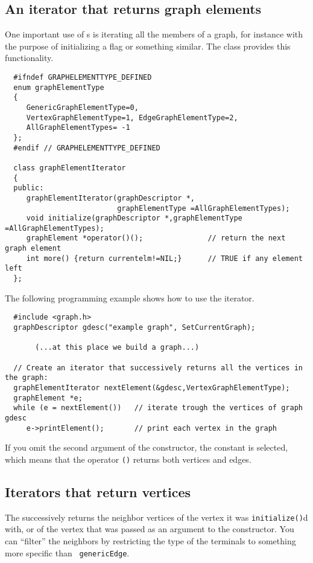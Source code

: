 \subsection{An iterator that returns graph elements}
One important use of s is iterating all the members of a
graph, for instance with the purpose of initializing a flag or something
similar. The  class provides this functionality.

{\footnotesize \begin{verbatim}
  #ifndef GRAPHELEMENTTYPE_DEFINED
  enum graphElementType
  {
     GenericGraphElementType=0,
     VertexGraphElementType=1, EdgeGraphElementType=2,
     AllGraphElementTypes= -1
  };
  #endif // GRAPHELEMENTTYPE_DEFINED

  class graphElementIterator
  {
  public:
     graphElementIterator(graphDescriptor *,
                          graphElementType =AllGraphElementTypes);
     void initialize(graphDescriptor *,graphElementType =AllGraphElementTypes);
     graphElement *operator()();               // return the next graph element
     int more() {return currentelm!=NIL;}      // TRUE if any element left
  };
\end{verbatim}}

The following programming example shows how to use the iterator.

{\footnotesize \begin{verbatim}
  #include <graph.h>
  graphDescriptor gdesc("example graph", SetCurrentGraph);
  
       (...at this place we build a graph...)
  
  // Create an iterator that successively returns all the vertices in the graph:
  graphElementIterator nextElement(&gdesc,VertexGraphElementType);
  graphElement *e;
  while (e = nextElement())   // iterate trough the vertices of graph gdesc
     e->printElement();       // print each vertex in the graph
\end{verbatim}}

If you omit the second argument of the constructor, the constant
 is selected, which means that the operator {\tt ()}
returns both vertices and edges.

\subsection{Iterators that return vertices}
The  successively returns the neighbor
vertices of the vertex it was {\tt initialize()}d with, or of the vertex that
was passed as an argument to the constructor. You can ``filter'' the neighbors
by restricting the type of the terminals to something more specific than {\tt
genericEdge}.

